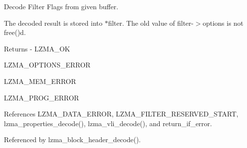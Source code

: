 Decode Filter Flags from given buffer. 

The decoded result is stored into $\ast$filter. The old value of filter-\/$>$options is not free()d.

\begin{DoxyReturn}{Returns}
-\/ L\-Z\-M\-A\-\_\-\-O\-K
\begin{DoxyItemize}
\item L\-Z\-M\-A\-\_\-\-O\-P\-T\-I\-O\-N\-S\-\_\-\-E\-R\-R\-O\-R
\item L\-Z\-M\-A\-\_\-\-M\-E\-M\-\_\-\-E\-R\-R\-O\-R
\item L\-Z\-M\-A\-\_\-\-P\-R\-O\-G\-\_\-\-E\-R\-R\-O\-R 
\end{DoxyItemize}
\end{DoxyReturn}


References L\-Z\-M\-A\-\_\-\-D\-A\-T\-A\-\_\-\-E\-R\-R\-O\-R, L\-Z\-M\-A\-\_\-\-F\-I\-L\-T\-E\-R\-\_\-\-R\-E\-S\-E\-R\-V\-E\-D\-\_\-\-S\-T\-A\-R\-T, lzma\-\_\-properties\-\_\-decode(), lzma\-\_\-vli\-\_\-decode(), and return\-\_\-if\-\_\-error.



Referenced by lzma\-\_\-block\-\_\-header\-\_\-decode().

